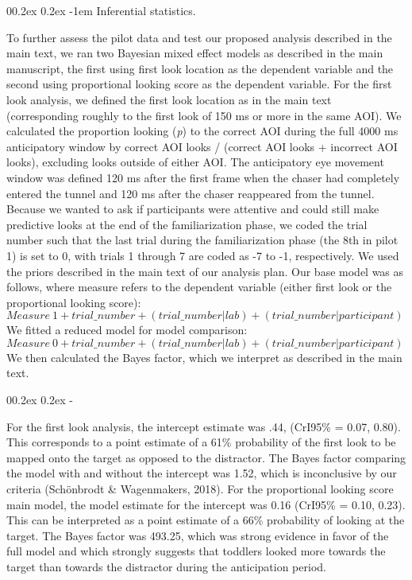 \documentclass[
  english,
  man, donotrepeattitle,floatsintext]{apa6}
\makeatletter
\let\oldparagraph\paragraph
\renewcommand{\paragraph}[1]{\oldparagraph{#1}\mbox{}}
\let\oldsubparagraph\subparagraph
\renewcommand{\subparagraph}[1]{\oldsubparagraph{#1}\mbox{}}
\renewcommand{\paragraph}{\@startsection{paragraph}{4}{\parindent}%
  {0\baselineskip \@plus 0.2ex \@minus 0.2ex}%
  {-1em}%
  {\normalfont\normalsize\bfseries\itshape\typesectitle}}
\renewcommand{\subparagraph}[1]{\@startsection{subparagraph}{5}{1em}%
  {0\baselineskip \@plus 0.2ex \@minus 0.2ex}%
  {-\z@\relax}%
  {\normalfont\normalsize\itshape\hspace{\parindent}{#1}\textit{\addperi}}{\relax}}
\makeatother
\begin{document}
\hypertarget{inferential-statistics.}{%
\paragraph{Inferential statistics.}\label{inferential-statistics.}}

To further assess the pilot data and test our proposed analysis described in the main text, we ran two Bayesian mixed effect models as described in the main manuscript, the first using first look location as the dependent variable and the second using proportional looking score as the dependent variable. For the first look analysis, we defined the first look location as in the main text (corresponding roughly to the first look of 150 ms or more in the same AOI). We calculated the proportion looking (\emph{p}) to the correct AOI during the full 4000 ms anticipatory window by correct AOI looks / (correct AOI looks + incorrect AOI looks), excluding looks outside of either AOI. The anticipatory eye movement window was defined 120 ms after the first frame when the chaser had completely entered the tunnel and 120 ms after the chaser reappeared from the tunnel.\\
Because we wanted to ask if participants were attentive and could still make predictive looks at the end of the familiarization phase, we coded the trial number such that the last trial during the familiarization phase (the 8th in pilot 1) is set to 0, with trials 1 through 7 are coded as -7 to -1, respectively. We used the priors described in the main text of our analysis plan. Our base model was as follows, where measure refers to the dependent variable (either first look or the proportional looking score):\\
\(Measure ~ 1 + trial\_number + (trial\_number | lab) + (trial\_number | participant)\)
We fitted a reduced model for model comparison:
\(Measure ~ 0 + trial\_number + ( trial\_number | lab) + (trial\_number | participant)\)
We then calculated the Bayes factor, which we interpret as described in the main text.

\hypertarget{toddlers.}{%
\subparagraph{Toddlers.}\label{toddlers.}}

For the first look analysis, the intercept estimate was .44, (CrI95\% = 0.07, 0.80). This corresponds to a point estimate of a 61\% probability of the first look to be mapped onto the target as opposed to the distractor. The Bayes factor comparing the model with and without the intercept was 1.52, which is inconclusive by our criteria (Schönbrodt \& Wagenmakers, 2018). For the proportional looking score main model, the model estimate for the intercept was 0.16 (CrI95\% = 0.10, 0.23). This can be interpreted as a point estimate of a 66\% probability of looking at the target. The Bayes factor was 493.25, which was strong evidence in favor of the full model and which strongly suggests that toddlers looked more towards the target than towards the distractor during the anticipation period.
\end{document}
